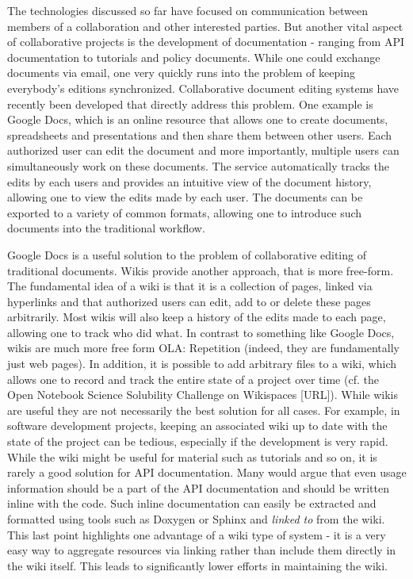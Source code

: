 \documentclass[11pt]{book}
\newcommand{\ola}[1]{{\color{green} OLA: #1}}
\begin{document}
The technologies discussed so far have focused on communication
between members of a collaboration and other interested parties. But
another vital aspect of collaborative projects is the development of
documentation - ranging from API documentation to tutorials and policy
documents. While one could exchange documents via email, one very
quickly runs into the problem of keeping everybody's editions
synchronized. Collaborative document editing systems have recently
been developed that directly address this problem. One example is
Google Docs, which is an online resource that allows one to create
documents, spreadsheets and presentations and then share them between
other users. Each authorized user can edit the document and more
importantly, multiple users can simultaneously work on these
documents. The service automatically tracks the edits by each users and
provides an intuitive view of the document history, allowing one to
view the edits made by each user. The documents can be exported to a
variety of common formats, allowing one to introduce such documents
into the traditional workflow.

Google Docs is a useful solution to the problem of collaborative
editing of traditional documents. Wikis provide another approach, that
is more free-form. The fundamental idea of a wiki is that it is a
collection of pages, linked via hyperlinks and that authorized users
can edit, add to or delete these pages arbitrarily. Most wikis will
also keep a history of the edits made to each page, allowing one to
track who did what. In contrast to something like Google Docs, wikis
are much more free form\ola{Repetition} (indeed, they are fundamentally just web
pages). In addition, it is possible to add arbitrary files to a wiki,
which allows one to record and track the entire state of a project
over time (cf. the Open Notebook Science Solubility Challenge on
Wikispaces [URL]). While wikis are useful they are not necessarily the
best solution for all cases. For example, in software development
projects, keeping an associated wiki up to date with the state of the
project can be tedious, especially if the development is very
rapid. While the wiki might be useful for material such as tutorials
and so on, it is rarely a good solution for API documentation. Many
would argue that even usage information should be a part of the API
documentation and should be written inline with the code. Such inline
documentation can easily be extracted and formatted using tools such
as Doxygen or Sphinx and \emph{linked to} from the wiki. This last
point highlights one advantage of a wiki type of system - it is a very
easy way to aggregate resources via linking rather than include them
directly in the wiki itself. This leads to significantly lower efforts
in maintaining the wiki.
\end{document}
